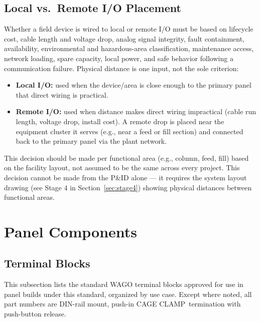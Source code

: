 \subsection{Local vs.\ Remote I/O Placement}
Whether a field device is wired to local or remote I/O must be based on lifecycle cost, cable length and voltage drop, analog signal integrity, fault containment, availability, environmental and hazardous-area classification, maintenance access, network loading, spare capacity, local power, and safe behavior following a communication failure. Physical distance is one input, not the sole criterion:
\begin{itemize}[itemsep=2pt]
  \item \textbf{Local I/O:} used when the device/area is close enough to the primary panel that direct wiring is practical.
  \item \textbf{Remote I/O:} used when distance makes direct wiring impractical (cable run length, voltage drop, install cost). A remote drop is placed near the equipment cluster it serves (e.g., near a feed or fill section) and connected back to the primary panel via the plant network.
\end{itemize}
This decision should be made per functional area (e.g., column, feed, fill) based on the facility layout, not assumed to be the same across every project. This decision cannot be made from the P\&ID alone --- it requires the system layout drawing (see Stage 4 in Section~\ref{sec:stage4}) showing physical distances between functional areas.

\section{Panel Components}
\subsection{Terminal Blocks}
This subsection lists the standard WAGO terminal blocks approved for use in panel builds under this standard, organized by use case. Except where noted, all part numbers are DIN-rail mount, push-in CAGE CLAMP\textregistered\ termination with push-button release.

